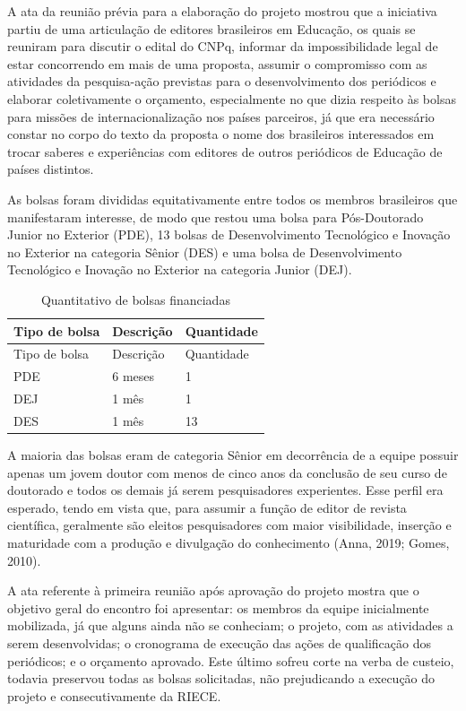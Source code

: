 \documentclass[
  a4paper,
]{book}
\begin{document}
A ata da reunião prévia para a elaboração do projeto mostrou que a
iniciativa partiu de uma articulação de editores brasileiros em
Educação, os quais se reuniram para discutir o edital do CNPq, informar
da impossibilidade legal de estar concorrendo em mais de uma proposta,
assumir o compromisso com as atividades da pesquisa-ação previstas para
o desenvolvimento dos periódicos e elaborar coletivamente o orçamento,
especialmente no que dizia respeito às bolsas para missões de
internacionalização nos países parceiros, já que era necessário constar
no corpo do texto da proposta o nome dos brasileiros interessados em
trocar saberes e experiências com editores de outros periódicos de
Educação de países distintos.

As bolsas foram divididas equitativamente entre todos os membros
brasileiros que manifestaram interesse, de modo que restou uma bolsa
para Pós-Doutorado Junior no Exterior (PDE), 13 bolsas de
Desenvolvimento Tecnológico e Inovação no Exterior na categoria Sênior
(DES) e uma bolsa de Desenvolvimento Tecnológico e Inovação no Exterior
na categoria Junior (DEJ).

\begin{longtable}[]{@{}lll@{}}
\caption{Quantitativo de bolsas financiadas}\label{tbl-3}\tabularnewline
\toprule\noalign{}
Tipo de bolsa & Descrição & Quantidade \\
\midrule\noalign{}
\endfirsthead
\toprule\noalign{}
Tipo de bolsa & Descrição & Quantidade \\
\midrule\noalign{}
\endhead
\bottomrule\noalign{}
\endlastfoot
PDE & 6 meses & 1 \\
DEJ & 1 mês & 1 \\
DES & 1 mês & 13 \\
\end{longtable}

A maioria das bolsas eram de categoria Sênior em decorrência de a equipe
possuir apenas um jovem doutor com menos de cinco anos da conclusão de
seu curso de doutorado e todos os demais já serem pesquisadores
experientes. Esse perfil era esperado, tendo em vista que, para assumir
a função de editor de revista científica, geralmente são eleitos
pesquisadores com maior visibilidade, inserção e maturidade com a
produção e divulgação do conhecimento (Anna, 2019; Gomes, 2010).

A ata referente à primeira reunião após aprovação do projeto mostra que
o objetivo geral do encontro foi apresentar: os membros da equipe
inicialmente mobilizada, já que alguns ainda não se conheciam; o
projeto, com as atividades a serem desenvolvidas; o cronograma de
execução das ações de qualificação dos periódicos; e o orçamento
aprovado. Este último sofreu corte na verba de custeio, todavia
preservou todas as bolsas solicitadas, não prejudicando a execução do
projeto e consecutivamente da RIECE.
\end{document}
